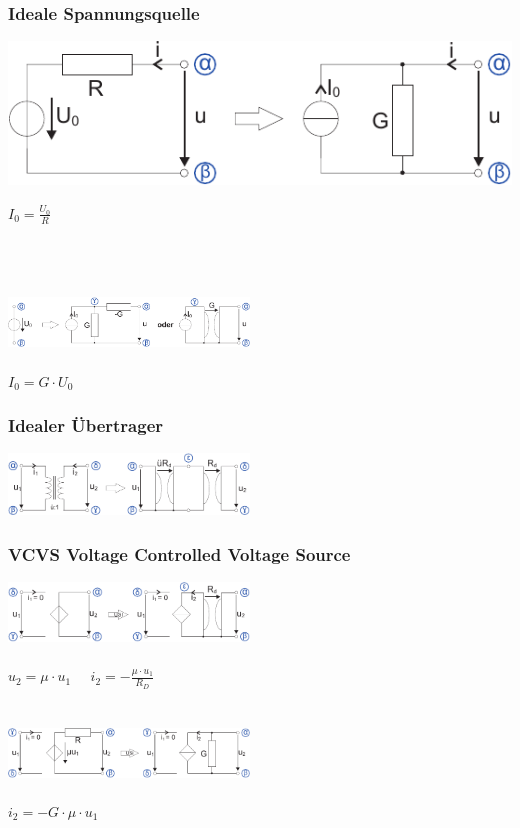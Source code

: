 \documentclass[a4paper,twocolumn,10pt]{article}
\begin{document}
\subsubsection*{Ideale Spannungsquelle}
\begin{minipage}[b]{0.35\textwidth}
\includegraphics[width=\textwidth]{Grafiken/KSA_Quellwandlung}
\end{minipage}
\hfill
\begin{minipage}[b]{0.1\textwidth}
$I_0=\frac{U_0}{R}$\\\\
\end{minipage}\\\\
\includegraphics[width=0.48\textwidth]{Grafiken/KSA_Quellwandlung2}\\\\
$I_0=G\cdot U_0$
\subsubsection*{Idealer Übertrager}
\includegraphics[width=0.48\textwidth]{Grafiken/KSA_Uebertrager}
\subsubsection*{VCVS Voltage Controlled Voltage Source}
\includegraphics[width=0.48\textwidth]{Grafiken/KSA_USU}\\\\
$u_2=\mu \cdot u_1\;\;\;\;\;i_2=-\frac{\mu \cdot u_1}{R_D}$\\\\\\
\includegraphics[width=0.48\textwidth]{Grafiken/KSA_USU2}\\\\
$i_2=-G\cdot \mu\cdot u_1$
\end{document}

